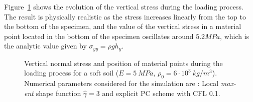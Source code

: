 \documentclass[preprint,12pt,a4paper]{elsarticle}
\begin{document}
Figure~\ref{fig:Block-LME3} shows the evolution of the vertical stress
during the loading process. The result is physically realistic as
the stress increases linearly from the top to the bottom of the specimen,
and the value of the vertical stress in a material point located in
the bottom of the specimen oscillates around $5.2 MPa$, which is
the analytic value given by $\sigma_{yy} = \rho g h_y$.
\begin{figure}
  \centering
  \caption{Vertical normal stress and position of material points
    during the loading process for a soft soil ($E = 5\ MPa$, $\rho_0
    = 6\cdot 10^3\ kg/m^3$). Numerical parameters considered for the
    simulation are : Local \textit{max-ent} shape function $\widehat{\gamma} =3$
    and explicit PC scheme with CFL 0.1.}
  \label{fig:Block-LME3}
\end{figure}
\end{document}
